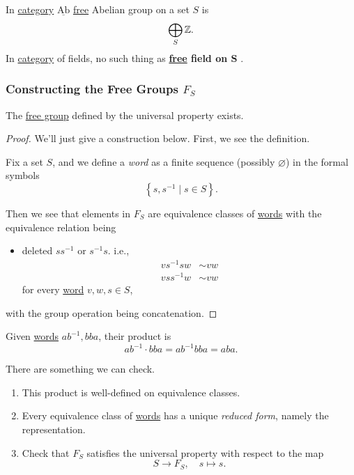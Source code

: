 \begin{eg}
	In \hyperref[def:category]{category} \(\underline{\mathrm{Ab}}\) \hyperref[def:free-group]{free} Abelian group on a set \(S\) is
	\[
		\bigoplus_S \mathbb{\MakeUppercase{z}}.
	\]
	In \hyperref[def:category]{category} of fields, no such thing as \textbf{\hyperref[def:free-group]{free} field on \(\bm{S} \) }.
\end{eg}

\subsubsection{Constructing the Free Groups \(F_S\)}
\begin{proposition}
	The \hyperref[def:free-group]{free group} defined by the universal property exists.
\end{proposition}
\begin{proof}
	We'll just give a construction below. First, we see the definition.
	\begin{definition}[Word]\label{def:word}
		Fix a set \(S\), and we define a \emph{word} as a finite sequence (possibly \(\varnothing \))
		in the formal symbols
		\[
			\left\{s, s ^{-1} \mid s\in S\right\}.
		\]
	\end{definition}

	Then we see that elements in \(F_S\) are equivalence classes of \hyperref[def:word]{words} with the equivalence relation being
	\begin{itemize}
		\item deleted \(s s ^{-1} \) or \(s ^{-1} s\). i.e.,
		      \[
			      \begin{split}
				      vs ^{-1} s w&\sim vw\\
				      v s s ^{-1}  w &\sim vw
			      \end{split}
		      \]
		      for every \hyperref[def:word]{word} \(v, w, s\in S\),
	\end{itemize}
	with the group operation being concatenation.
\end{proof}

\begin{eg}
	Given \hyperref[def:word]{words} \(ab^{-1} , bba\), their product is
	\[
		ab^{-1} \cdot bba = ab^{-1}  bb a = aba.
	\]
\end{eg}

\begin{exercise}
	There are something we can check.
	\begin{enumerate}
		\item This product is well-defined on equivalence classes.
		\item Every equivalence class of \hyperref[def:word]{words} has a unique \emph{reduced form}, namely the representation.
		\item Check that \(F_S\) satisfies the universal property with respect to the map
		      \[
			      S\to F_S,\quad s\mapsto s.
		      \]
	\end{enumerate}
\end{exercise}

